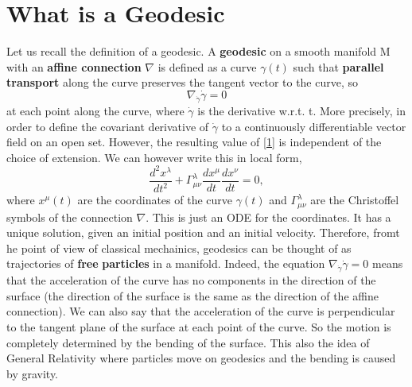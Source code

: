   \section{What is a Geodesic}
 Let us recall the definition of a geodesic. 
 A \textbf{geodesic} on a smooth manifold M with an \textbf{affine connection} $\nabla$ is defined as a curve 
 $\gamma(t)$ such that \textbf{parallel transport} along the curve preserves the tangent vector to the curve, so 
 \begin{equation}\label{1}
  \nabla_{\dot{\gamma}} \dot{\gamma} = 0
 \end{equation}
at each point along the curve, where $\dot{\gamma}$ is the derivative w.r.t. t. More precisely, in order to define the 
covariant derivative of $\dot{\gamma}$ to a continuously differentiable vector field on an open set. 
However, the resulting value of \ref{1} is independent of the choice of extension.
    We can however write this in local form, 
    \begin{equation*}
     \dfrac{d^{2} x^{\lambda}}{dt^2} + \Gamma_{\mu \nu}^{\lambda} \dfrac{dx^{\mu}}{dt} \dfrac{dx^{\nu}}{dt} = 0,
    \end{equation*}
where $x^{\mu}(t)$ are the coordinates of the curve $\gamma(t)$ and $\Gamma_{\mu \nu}^{\lambda}$ are the Christoffel
symbols of the connection $\nabla$. This is just an ODE for the coordinates. It has a unique solution, given an
initial position and an initial velocity. Therefore, fromt he point of view of classical mechainics, geodesics can 
be thought of as trajectories of \textbf{free} \textbf{particles} in a manifold. Indeed, the equation 
$\nabla_{\dot{\gamma}}\dot{\gamma} = 0$ means that the acceleration of the curve has no components in the direction 
of the surface (the direction of the surface is the same as the direction of the affine connection). We can also 
say that the acceleration of the curve is perpendicular to the tangent plane of the surface at each point of the
curve. So the motion is completely determined by the bending of the surface. This also the idea of General Relativity where
particles move on geodesics and the bending is caused by gravity. 
